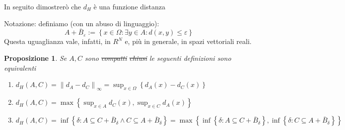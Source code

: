 \documentclass[a4paper,10pt]{article}
\newcounter{counter1}
\theoremstyle{plain}
\newtheorem{mypro}[counter1]{Proposizione}
\theoremstyle{definition}
\theoremstyle{remark}
\newcommand{\set}[1]{\left\{#1\right\}}
\newcommand{\norm}[1]{\left\|#1\right\|}
\begin{document}
In seguito dimostrerò che $d_H$ è una funzione distanza

Notazione: definiamo (con un abuso di linguaggio):
\[ A + \bar B_\varepsilon := \set{ x \in \Omega : \exists y \in A :
  d(x,y) \le \varepsilon }\]
Questa uguaglianza vale, infatti, in $R^N$ e, più in generale, in
spazi vettoriali reali.


\begin{mypro}
  Se $A, C$ sono \sout{compatti} \sout{chiusi} le seguenti definizioni
  sono equivalenti
  \begin{enumerate}
  \item $ d_H (A,C) = \norm{ d_A - d_C } _\infty = \sup _{x\in \Omega}
    \set {d_A(x) - d_C(x)}$
  \item $d_H(A,C) = \max \set{\sup _{x\in A} d_C (x) , \sup _{x\in C}
      d_A (x) }$
  \item $d_H (A,C) = \inf \set{\delta : A \subseteq C + \bar B
    _\delta \wedge C \subseteq A + \bar B_\delta} = \max \set{\inf
    \set{\delta : A \subseteq C + \bar B _\delta }, \inf \set{\delta : C
      \subseteq A + \bar B _\delta }}  $
  \end{enumerate}
\end{mypro}
\end{document}
